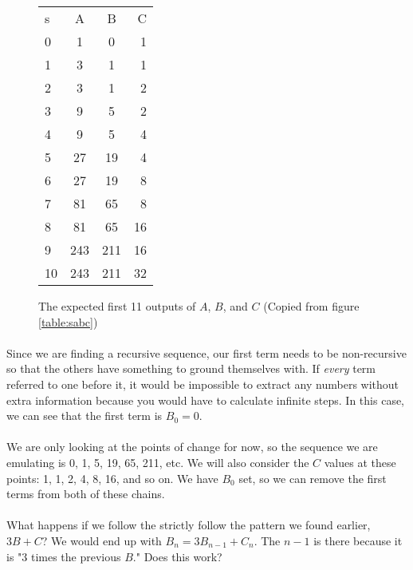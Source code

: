 \documentclass[12pt,letterpaper]{article}
\begin{document}
			\begin{figure*}[h]
				\centering
				\begin{tabular}{l | c | c | r}
					s & A & B & C \\
					0 & 1 & 0 & 1 \\
					1 & 3 & 1 & 1 \\
					2 & 3 & 1 & 2 \\
					3 & 9 & 5 & 2 \\
					4 & 9 & 5 & 4 \\
					5 & 27 & 19 & 4 \\
					6 & 27 & 19 & 8 \\
					7 & 81 & 65 & 8 \\
					8 & 81 & 65 & 16 \\
					9 & 243 & 211 & 16 \\
					10 & 243 & 211 & 32 \\
				\end{tabular}
				
				\captionsetup{list=no,format=hang}
				\caption*{The expected first 11 outputs of $A$, $B$, and $C$ (Copied from figure \ref{table:sabc})}
			\end{figure*}
		
			\paragraph{} Since we are finding a recursive sequence, our first term needs to be non-recursive so that the others have something to ground themselves with. If \textit{every} term referred to one before it, it would be impossible to extract any numbers without extra information because you would have to calculate infinite steps. In this case, we can see that the first term is $B_0 = 0$.
			
			\paragraph{} We are only looking at the points of change for now, so the sequence we are emulating is 0, 1, 5, 19, 65, 211, etc. We will also consider the $C$ values at these points: 1, 1, 2, 4, 8, 16, and so on. We have $B_0$ set, so we can remove the first terms from both of these chains. 
			
			\paragraph{} What happens if we follow the strictly follow the pattern we found earlier, $3B + C$? We would end up with $B_n = 3B_{n-1} + C_n$. The $n-1$ is there because it is "3 times the previous $B$." Does this work?
			
\end{document}

